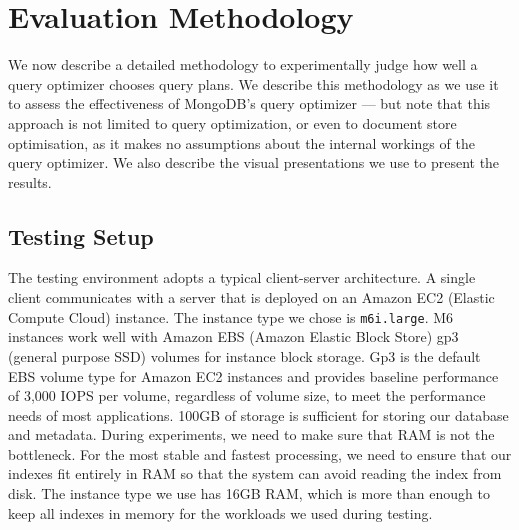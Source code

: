 \section{Evaluation Methodology}%
\label{sec:methodology}
We now describe a detailed methodology to experimentally judge how well a query optimizer chooses query plans. We describe this methodology as we use it to assess the effectiveness of MongoDB's \approachName query optimizer --- but note that this approach is not limited to \approachName query optimization, or even to document store optimisation, as it makes no assumptions about the internal workings of the query optimizer. We also describe the visual presentations we use to present the results. %


\subsection{Testing Setup}
The testing environment adopts a typical client-server architecture. A single client communicates with a \relname server that is deployed on an Amazon EC2 (Elastic Compute Cloud) instance. The instance type we chose is \verb|m6i.large|. M6 instances work well with Amazon EBS (Amazon Elastic Block Store) gp3 (general purpose SSD) volumes for instance block storage. Gp3 is the default EBS volume type for Amazon EC2 instances and provides baseline performance of 3,000 IOPS per volume, regardless of volume size, to meet the performance needs of most applications. 100GB of storage is sufficient for storing our database and metadata. During experiments, we need to make sure that RAM is not the bottleneck. For the most stable and fastest processing, we need to ensure that our indexes fit entirely in RAM so that the system can avoid reading the index from disk. The instance type we use has 16GB RAM, which is more than enough to keep all indexes in memory for the workloads we used during testing.

\begin{comment}
\af{Where is the client deployed? what hardware, network characteristics to server?}
\end{comment}

